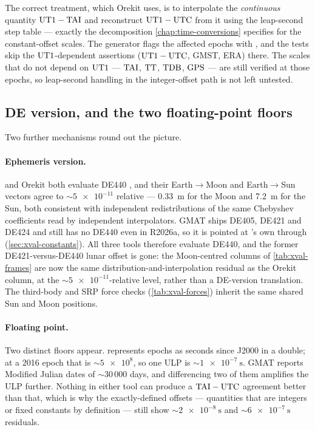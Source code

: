 The correct treatment, which Orekit uses, is to interpolate the
\emph{continuous} quantity $\mathrm{UT1}-\mathrm{TAI}$ and reconstruct $\mathrm{UT1}-\mathrm{UTC}$ from it
using the leap-second step table --- exactly the decomposition
\cref{chap:time-conversions} specifies for the constant-offset scales. The
generator flags the affected epochs with , and
the tests skip the $\mathrm{UT1}$-dependent assertions ($\mathrm{UT1}-\mathrm{UTC}$, GMST, ERA)
there. The scales that do not depend on $\mathrm{UT1}$ --- $\mathrm{TAI}$, $\mathrm{TT}$, $\mathrm{TDB}$,
$\mathrm{GPS}$ --- are still verified at those epochs, so leap-second handling in the
integer-offset path is not left untested.

\subsection{DE version, and the two floating-point floors}
\label{sec:xval-de}

Two further mechanisms round out the picture.

\paragraph{Ephemeris version.} \lupnt{} and Orekit both evaluate DE440
\citep{park2021de440}, and their Earth$\to$Moon and Earth$\to$Sun vectors
agree to ${\sim}\num{5e-11}$ relative --- \SI{0.33}{\meter} for the Moon and
\SI{7.2}{\meter} for the Sun, both consistent with independent
redistributions of the same Chebyshev coefficients read by independent
interpolators. GMAT ships DE405, DE421 and DE424 and still has no DE440 even in
R2026a, so it is pointed at \lupnt{}'s own  through
 (\cref{sec:xval-constants}). All three tools
therefore evaluate DE440, and the former DE421-versus-DE440 lunar offset is
gone: the Moon-centred columns of \cref{tab:xval-frames} are now the same
distribution-and-interpolation residual as the Orekit column, at the
${\sim}\num{5e-11}$-relative level, rather than a DE-version translation. The
third-body and SRP force checks (\cref{tab:xval-forces}) inherit the same shared
Sun and Moon positions.

\paragraph{Floating point.} Two distinct floors appear. \lupnt{} represents
epochs as seconds since J2000 in a double; at a 2016 epoch that is
${\sim}\num{5e8}$, so one ULP is ${\sim}\SI{1e-7}{\second}$. GMAT reports
Modified Julian dates of ${\sim}30\,000$ days, and differencing two of them
amplifies the ULP further. Nothing in either tool can produce a $\mathrm{TAI}-\mathrm{UTC}$
agreement better than that, which is why the exactly-defined offsets ---
quantities that are integers or fixed constants by definition --- still show
${\sim}\SI{2e-8}{\second}$ and ${\sim}\SI{6e-7}{\second}$ residuals.

